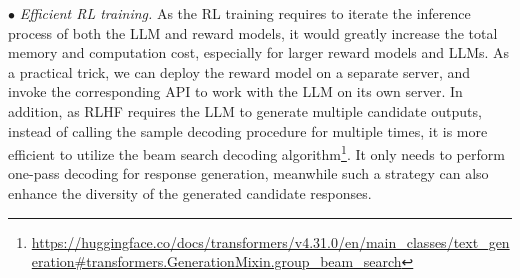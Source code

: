 {$\bullet$ \textit{Efficient RL training.}
As the RL training requires to iterate the inference process of both the LLM and reward models, it would greatly increase the total memory and computation cost, especially for larger reward models and LLMs.
As a practical trick, we can deploy the reward model on a separate server, and invoke the corresponding API to work with the LLM on its own server. 
In addition, as RLHF requires the LLM to generate multiple candidate  outputs, instead of calling the sample decoding procedure for multiple times, it is more efficient to utilize the  beam search decoding algorithm\footnote{\url{https://huggingface.co/docs/transformers/v4.31.0/en/main\_classes/text\_generation\#transformers.GenerationMixin.group\_beam\_search}}.
It only needs to perform one-pass decoding  for response generation, meanwhile such a strategy can also enhance the diversity of the generated candidate responses.  }



